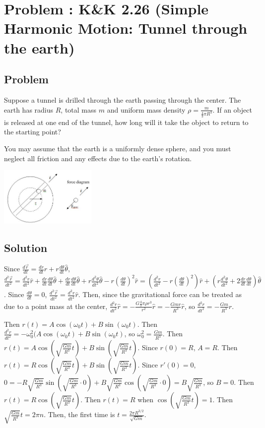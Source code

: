 \documentclass[solutions]{esg8012pset}
\begin{document}
\section{Problem \thesection: K\&K 2.26 (Simple Harmonic Motion: Tunnel through the earth)}
\subsection{Problem}
  Suppose a tunnel is drilled through the earth passing through the center. The earth has radius $R$, total mass $m$ and uniform mass density $\rho = \frac{m}{\frac{4}{3}\pi R^3}$.  If an object is released at one end of the tunnel, how long will it take the object to return to the starting point?

  You may assume that the earth is a uniformly dense sphere, and you must neglect all friction and any effects due to the earth's rotation.
  \begin{center}\includegraphics[width=0.35\textwidth]{ps03_2}\end{center}
\subsection{Solution}
  Since $\frac{d \vec r}{d t} = \frac{d r}{d t}\hat r + r\frac{d \theta}{d t}\hat\theta$, $\frac{d^2 \vec r}{d t^2} = \frac{d^2 r}{d t^2}\hat r + \frac{d r}{d t}\frac{d \theta}{d t}\hat \theta + \frac{d r}{d t}\frac{d \theta}{d t}\hat\theta + r\frac{d^2 \theta}{d t^2}\hat\theta - r\left(\frac{d \theta}{d t}\right)^2\hat r = \left(\frac{d^2 r}{d t^2}- r\left(\frac{d \theta}{d t}\right)^2\right)\hat r + \left(r\frac{d^2 \theta}{d t^2} + 2\frac{d r}{d t}\frac{d \theta}{d t}\right)\hat \theta$.  Since $\frac{d \theta}{d t} = 0$, $\frac{d^2 \vec r}{d t^2} =  \frac{d^2 r}{d t^2}\hat r$.  Then, since the gravitational force can be treated as due to a point mass at the center, $\frac{d^2 r}{d t^2}\hat r = -\frac{G \frac{4}{3}\pi \rho r^3}{r^2} \hat r = -\frac{G m r}{R^3} \hat r$, so $\frac{d^2 r}{d t^2} = -\frac{G m}{R^3}r$.

  Then $r(t) = A\cos(\omega_0 t) + B\sin(\omega_0 t)$.  Then $\frac{d^2 r}{d t^2} = -\omega_0^2(A\cos(\omega_0 t) + B\sin(\omega_0 t)$, so $\omega_0^2 = \frac{G m}{R^3}$.  Then $r(t) = A\cos\left(\sqrt{\frac{G m}{R^3}} t\right) + B\sin\left(\sqrt{\frac{G m}{R^3}} t\right)$.  Since $r(0) = R$, $A = R$.  Then $r(t) = R\cos\left(\sqrt{\frac{G m}{R^3}} t\right) + B\sin\left(\sqrt{\frac{G m}{R^3}} t\right)$.  Since $r'(0) = 0$, $0 = -R\sqrt{\frac{G m}{R^3}}\sin\left(\sqrt{\frac{G m}{R^3}} \cdot 0\right) + B\sqrt{\frac{G m}{R^3}}\cos\left(\sqrt{\frac{G m}{R^3}} \cdot 0\right) = B\sqrt{\frac{G m}{R^3}}$, so $B = 0$.  Then $r(t) = R\cos\left(\sqrt{\frac{G m}{R^3}} t\right)$.  Then $r(t) = R$ when $\cos\left(\sqrt{\frac{G m}{R^3}} t\right) = 1$.  Then $\sqrt{\frac{G m}{R^3}} t = 2\pi n$.  Then, the first time is $t = \frac{2\pi R^{3/2}}{\sqrt{G m}}$.
\end{document}
